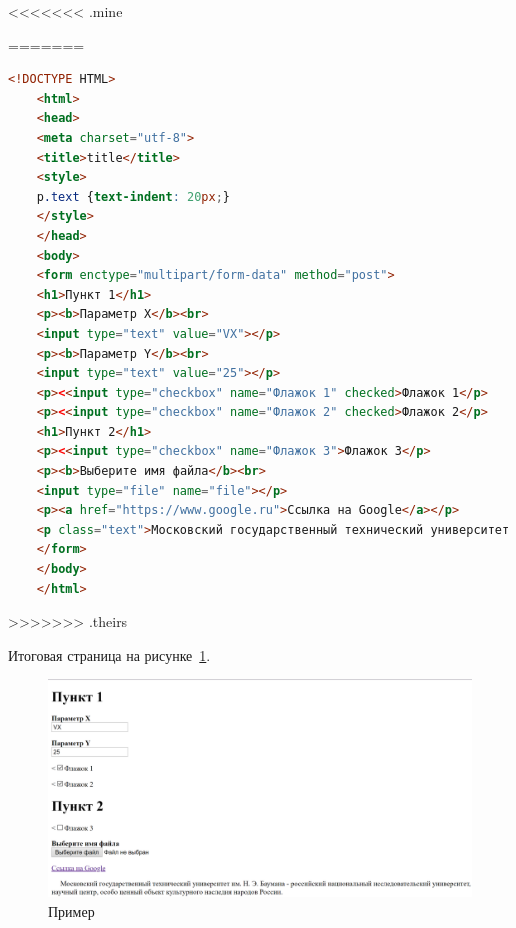 <<<<<<< .mine































=======

\begin{lstlisting}[frame=single, label={rndhpcgui.2023.02.28.HTML}, caption={Пример выходных данных}, language={HTML}] 
	<!DOCTYPE HTML>
	<html>
	<head>
	<meta charset="utf-8">
	<title>title</title>
	<style>
	p.text {text-indent: 20px;}
	</style>
	</head>
	<body>
	<form enctype="multipart/form-data" method="post">
	<h1>Пункт 1</h1>
	<p><b>Параметр X</b><br>
	<input type="text" value="VX"></p>
	<p><b>Параметр Y</b><br>
	<input type="text" value="25"></p>
	<p><<input type="checkbox" name="Флажок 1" checked>Флажок 1</p>
	<p><<input type="checkbox" name="Флажок 2" checked>Флажок 2</p>
	<h1>Пункт 2</h1>
	<p><<input type="checkbox" name="Флажок 3">Флажок 3</p>
	<p><b>Выберите имя файла</b><br>
	<input type="file" name="file"></p>
	<p><a href="https://www.google.ru">Ссылка на Google</a></p>
	<p class="text">Московский государственный технический университет им. Н. Э. Баумана - российский национальный исследовательский университет, научный центр, особо ценный объект культурного наследия народов России.</p>
	</form>
	</body>
	</html>
\end{lstlisting}

>>>>>>> .theirs

Итоговая страница на рисунке~\ref{rndhpcgui.2023.02.28.picture1}.


\begin{figure}[!ht]
  \centering
  \includegraphics[scale=0.4]{ResearchNotes/rndhpc_dev_gui_2023_02_28/rndhpcgui.2023.02.28.picture1.png}
  \caption{Пример}
  \label{rndhpcgui.2023.02.28.picture1}
\end{figure}

